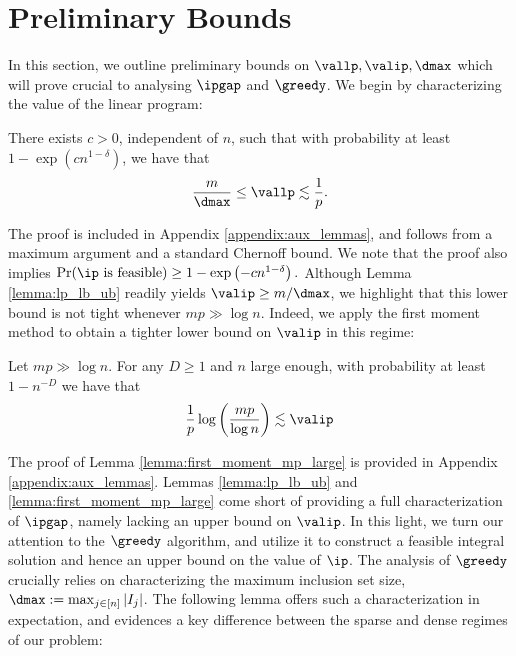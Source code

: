\section{Preliminary Bounds}\label{sec:bounds_LP_IP}
\label{sec:bounds}
%
In this section, we outline preliminary bounds on $\vallp, \valip, \dmax$ which will prove crucial to analysing $\ipgap$ and $\greedy$. We begin by characterizing the value of the linear program:
%
\begin{lemma}\label{lemma:lp_lb_ub}
There exists $c > 0$, independent of $n$, such that with probability at least $1 - \exp(c n^{1 - \delta})$, we have that
\[\frac{m}{\dmax} \leq \vallp \lesssim \frac{1}{p}.\]
\end{lemma}
%
The proof is included in Appendix \ref{appendix:aux_lemmas}, and follows from a maximum argument and a standard Chernoff bound. We note that the proof also implies \(\Pr(\ip \text{ is feasible}) \geq 1 - \exp\left(-cn^{1-\delta}\right).\) Although Lemma \ref{lemma:lp_lb_ub} readily yields $\valip \geq m/\dmax$, we highlight that this lower bound is not tight whenever $mp \gg \log{n}$. Indeed, we apply the first moment method to obtain a tighter lower bound on $\valip$ in this regime:
%
\begin{lemma}
\label{lemma:first_moment_mp_large}
Let \(mp \gg \log n\). For any \(D \geq 1\) and \(n\) large enough, with probability at least $1 - n^{-D}$ we have that
\begin{align*}
    \frac{1}{p} \log \left(\frac{mp}{\log n}\right) \lesssim \valip 
\end{align*}
\end{lemma}
%
The proof of Lemma \ref{lemma:first_moment_mp_large} is provided in Appendix \ref{appendix:aux_lemmas}. Lemmas \ref{lemma:lp_lb_ub} and \ref{lemma:first_moment_mp_large} come short of providing a full characterization of $\ipgap$, namely lacking an upper bound on $\valip$. In this light, we turn our attention to the $\greedy$ algorithm, and utilize it to construct a feasible integral solution and hence an upper bound on the value of $\ip$. The analysis of $\greedy$ crucially relies on characterizing the maximum inclusion set size, $\dmax := \max_{j \in [n]} |I_j|$. The following lemma offers such a characterization in expectation, and evidences a key difference between the sparse and dense regimes of our problem:
